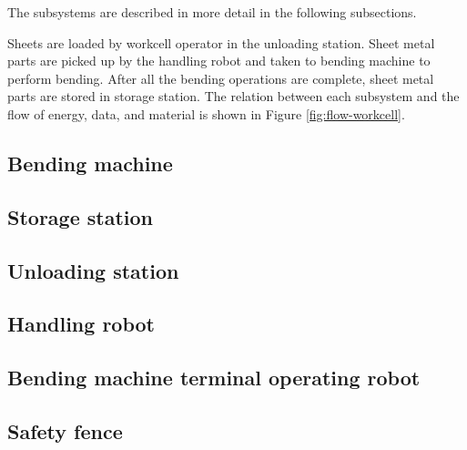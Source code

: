 The subsystems are described in more detail in the following
subsections. 


Sheets are loaded by workcell operator in the unloading station. Sheet metal parts are picked up by the handling robot and taken to bending machine to perform bending.
After all the bending operations are complete, sheet metal parts are stored in storage station.
The relation between each subsystem and the flow of energy, data, and material is shown in Figure \ref{fig:flow-workcell}.




\subsection{Bending machine}
\label{sub:bending-machine}


\subsection{Storage station}
\label{sub:storage-station}


\subsection{Unloading station}
\label{sub:unloading-station}


\subsection{Handling robot}
\label{sub:handling-robot}


\subsection{Bending machine terminal operating robot}
\label{sub:panda-robot}


\subsection{Safety fence}
\label{sub:safety-fence}

